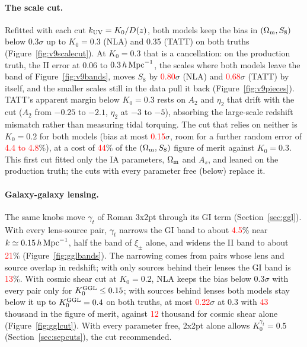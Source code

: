 \documentclass[11pt]{article}
\newcommand{\hMpc}{\,h\,{\rm Mpc}^{-1}}
\newcommand{\kuv}{k_{\rm UV}}
\newcommand{\Om}{\Omega_{\rm m}}
\newif\ifnumbersfinal
\newcommand{\refresh}[1]{\ifnumbersfinal#1\else\textcolor{red}{#1}\fi}
\newcommand{\CutIINLAThree}{\refresh{0.80}}
\newcommand{\CutIITATTThree}{\refresh{0.68}}
\newcommand{\CutNLAMaxRobust}{\refresh{0.15}}
\newcommand{\CutRoomNLATwo}{\refresh{4.4 to 4.8}}
\newcommand{\CutFoMNLA}{\refresh{44}}
\newcommand{\GGLBandGIallThree}{\refresh{4.5}}
\newcommand{\GGLBandGIbehThree}{\refresh{13}}
\newcommand{\GGLBandIIallThree}{\refresh{21}}
\newcommand{\GGLbehMaxThree}{\refresh{0.22}}
\newcommand{\GGLFoMcs}{\refresh{12}}
\newcommand{\GGLFoMbehThree}{\refresh{43}}
\newcommand{\Tol}{0.3}
\begin{document}
\paragraph{The scale cut.}
Refitted with each cut $\kuv = K_0/D(z)$, both models keep the bias in
$(\Om, S_8)$ below \Tol$\sigma$ up to $K_0 = 0.3$ (NLA) and 0.35 (TATT)
on both truths (Figure~\ref{fig:v9scalecut}). At $K_0 = 0.3$ that is a
cancellation: on the production truth, the II error at 0.06 to
$0.3\hMpc$, the scales where both models leave the band of
Figure~\ref{fig:v9bands}, moves $S_8$ by \CutIINLAThree$\sigma$ (NLA) and
\CutIITATTThree$\sigma$ (TATT) by itself, and the smaller scales still in
the data pull it back (Figure~\ref{fig:v9pieces}). TATT's apparent margin
below $K_0 = 0.3$ rests on $A_2$ and $\eta_2$ that drift with the cut
($A_2$ from $-0.25$ to $-2.1$, $\eta_2$ at $-3$ to $-5$), absorbing the
large-scale redshift mismatch rather than measuring tidal torquing. The cut
that relies on neither is $K_0 = 0.2$ for both models (bias at most
\CutNLAMaxRobust$\sigma$, room for a further random error of
\CutRoomNLATwo\%), at a cost of \CutFoMNLA\% of the $(\Om, S_8)$ figure
of merit against $K_0 = 0.3$. This first cut fitted only the IA parameters,
$\Om$ and $A_s$, and leaned on the production truth; the cuts with every
parameter free (below) replace it.

\paragraph{Galaxy-galaxy lensing.}
The same knobs move $\gamma_t$ of Roman 3x2pt through its GI term
(Section~\ref{sec:ggl}). With every lens-source pair, $\gamma_t$ narrows the
GI band to about \GGLBandGIallThree\% near $k \simeq 0.15\hMpc$, half the
band of $\xi_\pm$ alone, and widens the II band to about
\GGLBandIIallThree\% (Figure~\ref{fig:gglbands}). The narrowing comes from
pairs whose lens and source overlap in redshift; with only sources behind
their lenses the GI band is \GGLBandGIbehThree\%. With cosmic shear cut at
$K_0 = 0.2$, NLA keeps the bias below \Tol$\sigma$ with every pair only for
$K_0^{\rm GGL} \le 0.15$; with sources behind lenses both models stay
below it up to $K_0^{\rm GGL} = 0.4$ on both truths, at most
\GGLbehMaxThree$\sigma$ at 0.3 with \GGLFoMbehThree{} thousand in the
figure of merit, against \GGLFoMcs{} thousand for cosmic shear alone
(Figure~\ref{fig:gglcut}). With every parameter free, 2x2pt alone allows
$K_0^{\gamma_t} = 0.5$ (Section~\ref{sec:sepcuts}), the cut recommended.
\end{document}
